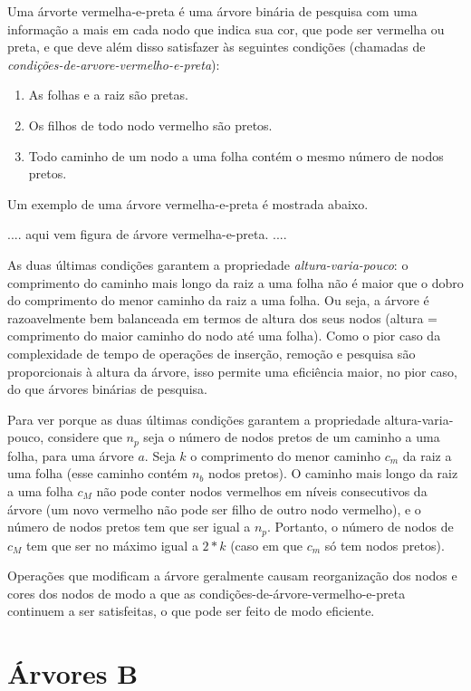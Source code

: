 Uma árvorte vermelha-e-preta é uma árvore binária de pesquisa com uma
informação a mais em cada nodo que indica sua cor, que pode ser
vermelha ou preta, e que deve além disso satisfazer às seguintes
condições (chamadas de {\em condições-de-arvore-vermelho-e-preta\/}):

\begin{enumerate}

\item As folhas e a raiz são pretas.

\item Os filhos de todo nodo vermelho são pretos.

\item Todo caminho de um nodo a uma folha contém o mesmo número de
  nodos pretos.

\end{enumerate}

Um exemplo de uma árvore vermelha-e-preta é mostrada abaixo.

.... aqui vem figura de árvore vermelha-e-preta. ....

As duas últimas condições garantem a propriedade {\em
  altura-varia-pouco\/}: o comprimento do caminho mais longo da raiz a
uma folha não é maior que o dobro do comprimento do menor caminho da
raiz a uma folha. Ou seja, a árvore é razoavelmente bem balanceada em
termos de altura dos seus nodos (altura = comprimento do maior caminho
do nodo até uma folha). Como o pior caso da complexidade de tempo de
operações de inserção, remoção e pesquisa são proporcionais à altura
da árvore, isso permite uma eficiência maior, no pior caso, do que
árvores binárias de pesquisa.

Para ver porque as duas últimas condições garantem a propriedade
altura-varia-pouco, considere que $n_p$ seja o número de nodos pretos
de um caminho a uma folha, para uma árvore $a$.  Seja $k$ o
comprimento do menor caminho $c_m$ da raiz a uma folha (esse caminho
contém $n_b$ nodos pretos). O caminho mais longo da raiz a uma folha
$c_M$ não pode conter nodos vermelhos em níveis consecutivos da árvore
(um novo vermelho não pode ser filho de outro nodo vermelho), e o
número de nodos pretos tem que ser igual a $n_p$. Portanto, o número
de nodos de $c_M$ tem que ser no máximo igual a $2*k$ (caso em que
$c_m$ só tem nodos pretos).

Operações que modificam a árvore geralmente causam reorganização dos
nodos e cores dos nodos de modo a que as
condições-de-árvore-vermelho-e-preta continuem a ser satisfeitas, o
que pode ser feito de modo eficiente. 


\section{Árvores B}
\label{sec:arvores-B}
